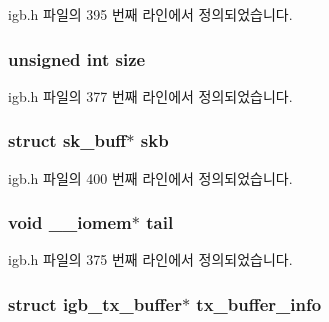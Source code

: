igb.\+h 파일의 395 번째 라인에서 정의되었습니다.

\subsubsection[{\texorpdfstring{size}{size}}]{\setlength{\rightskip}{0pt plus 5cm}unsigned int size}\hypertarget{structigb__ring_aac913b3a1f6ef005d66bf7a84428773e}{}\label{structigb__ring_aac913b3a1f6ef005d66bf7a84428773e}


igb.\+h 파일의 377 번째 라인에서 정의되었습니다.

\subsubsection[{\texorpdfstring{skb}{skb}}]{\setlength{\rightskip}{0pt plus 5cm}struct sk\+\_\+buff$\ast$ skb}\hypertarget{structigb__ring_aeba6836824708325a83121030f092c30}{}\label{structigb__ring_aeba6836824708325a83121030f092c30}


igb.\+h 파일의 400 번째 라인에서 정의되었습니다.

\subsubsection[{\texorpdfstring{tail}{tail}}]{\setlength{\rightskip}{0pt plus 5cm}void \+\_\+\+\_\+iomem$\ast$ tail}\hypertarget{structigb__ring_a65a385f7b610d6989dc2ff7204439ab6}{}\label{structigb__ring_a65a385f7b610d6989dc2ff7204439ab6}


igb.\+h 파일의 375 번째 라인에서 정의되었습니다.

\subsubsection[{\texorpdfstring{tx\+\_\+buffer\+\_\+info}{tx_buffer_info}}]{\setlength{\rightskip}{0pt plus 5cm}struct {\bf igb\+\_\+tx\+\_\+buffer}$\ast$ tx\+\_\+buffer\+\_\+info}\hypertarget{structigb__ring_a597a573b63aa80ad839fab10dac560b8}{}\label{structigb__ring_a597a573b63aa80ad839fab10dac560b8}


